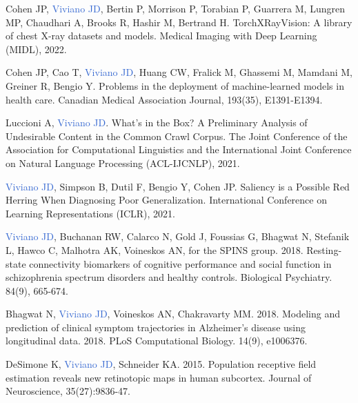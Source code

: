 \documentclass[a4paper,11pt,oneside]{book}
\newcommand\paper[1]{
    #1\\
    \vspace{3.5mm}
}
\begin{document}
\begin{flushleft}
\paper{Cohen JP, \textcolor{highlight}{Viviano JD}, Bertin P, Morrison P, Torabian P, Guarrera M, Lungren MP, Chaudhari A, Brooks R, Hashir M, Bertrand H. TorchXRayVision: A library of chest X-ray datasets and models. Medical Imaging with Deep Learning (MIDL), 2022.}

\paper{Cohen JP, Cao T, \textcolor{highlight}{Viviano JD}, Huang CW, Fralick M, Ghassemi M, Mamdani M, Greiner R, Bengio Y. Problems in the deployment of machine-learned models in health care. Canadian Medical Association Journal, 193(35), E1391-E1394.}

\paper{Luccioni A, \textcolor{highlight}{Viviano JD}. What’s in the Box? A Preliminary Analysis of Undesirable Content in the Common Crawl Corpus. The Joint Conference of the Association for Computational Linguistics and the International Joint Conference on Natural Language Processing (ACL-IJCNLP), 2021.}

\paper{\textcolor{highlight}{Viviano JD}, Simpson B, Dutil F, Bengio Y, Cohen JP. Saliency is a Possible Red Herring When Diagnosing Poor Generalization. International Conference on Learning Representations (ICLR), 2021.}

\paper{\textcolor{highlight}{Viviano JD}, Buchanan RW, Calarco N, Gold J, Foussias G, Bhagwat N, Stefanik L, Hawco C, Malhotra AK, Voineskos AN, for the SPINS group. 2018. Resting-state connectivity biomarkers of cognitive performance and social function in schizophrenia spectrum disorders and healthy controls. Biological Psychiatry. 84(9), 665-674.}


\paper{Bhagwat N, \textcolor{highlight}{Viviano JD}, Voineskos AN, Chakravarty MM. 2018. Modeling and prediction of clinical symptom trajectories in Alzheimer's disease using longitudinal data. 2018. PLoS Computational Biology. 14(9), e1006376.}


\paper{DeSimone K, \textcolor{highlight}{Viviano JD}, Schneider KA. 2015. Population receptive field estimation reveals new retinotopic maps in human subcortex. Journal of Neuroscience, 35(27):9836-47.}


\end{flushleft}
\end{document}
